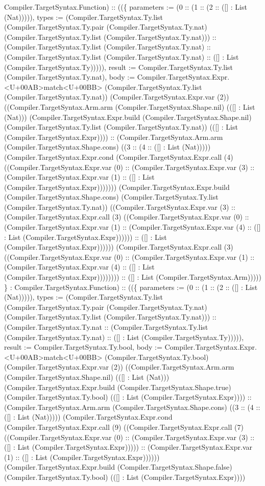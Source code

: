 \documentclass[11pt]{article}
\begin{document}
Compiler.TargetSyntax.Function) :: ((\{ parameters := (0 :: (1 :: (2 :: ([] : List (Nat))))), types := (Compiler.TargetSyntax.Ty.list (Compiler.TargetSyntax.Ty.pair (Compiler.TargetSyntax.Ty.nat) (Compiler.TargetSyntax.Ty.list (Compiler.TargetSyntax.Ty.nat))) :: (Compiler.TargetSyntax.Ty.list (Compiler.TargetSyntax.Ty.nat) :: (Compiler.TargetSyntax.Ty.list (Compiler.TargetSyntax.Ty.nat) :: ([] : List (Compiler.TargetSyntax.Ty))))), result := Compiler.TargetSyntax.Ty.list (Compiler.TargetSyntax.Ty.nat), body := Compiler.TargetSyntax.Expr.<U+00AB>match<U+00BB> (Compiler.TargetSyntax.Ty.list (Compiler.TargetSyntax.Ty.nat)) (Compiler.TargetSyntax.Expr.var (2)) ((Compiler.TargetSyntax.Arm.arm (Compiler.TargetSyntax.Shape.nil) (([] : List (Nat))) (Compiler.TargetSyntax.Expr.build (Compiler.TargetSyntax.Shape.nil) (Compiler.TargetSyntax.Ty.list (Compiler.TargetSyntax.Ty.nat)) (([] : List (Compiler.TargetSyntax.Expr)))) :: (Compiler.TargetSyntax.Arm.arm (Compiler.TargetSyntax.Shape.cons) ((3 :: (4 :: ([] : List (Nat))))) (Compiler.TargetSyntax.Expr.cond (Compiler.TargetSyntax.Expr.call (4) ((Compiler.TargetSyntax.Expr.var (0) :: (Compiler.TargetSyntax.Expr.var (3) :: (Compiler.TargetSyntax.Expr.var (1) :: ([] : List (Compiler.TargetSyntax.Expr))))))) (Compiler.TargetSyntax.Expr.build (Compiler.TargetSyntax.Shape.cons) (Compiler.TargetSyntax.Ty.list (Compiler.TargetSyntax.Ty.nat)) ((Compiler.TargetSyntax.Expr.var (3) :: (Compiler.TargetSyntax.Expr.call (3) ((Compiler.TargetSyntax.Expr.var (0) :: (Compiler.TargetSyntax.Expr.var (1) :: (Compiler.TargetSyntax.Expr.var (4) :: ([] : List (Compiler.TargetSyntax.Expr)))))) :: ([] : List (Compiler.TargetSyntax.Expr)))))) (Compiler.TargetSyntax.Expr.call (3) ((Compiler.TargetSyntax.Expr.var (0) :: (Compiler.TargetSyntax.Expr.var (1) :: (Compiler.TargetSyntax.Expr.var (4) :: ([] : List (Compiler.TargetSyntax.Expr)))))))) :: ([] : List (Compiler.TargetSyntax.Arm))))) \} : Compiler.TargetSyntax.Function) :: ((\{ parameters := (0 :: (1 :: (2 :: ([] : List (Nat))))), types := (Compiler.TargetSyntax.Ty.list (Compiler.TargetSyntax.Ty.pair (Compiler.TargetSyntax.Ty.nat) (Compiler.TargetSyntax.Ty.list (Compiler.TargetSyntax.Ty.nat))) :: (Compiler.TargetSyntax.Ty.nat :: (Compiler.TargetSyntax.Ty.list (Compiler.TargetSyntax.Ty.nat) :: ([] : List (Compiler.TargetSyntax.Ty))))), result := Compiler.TargetSyntax.Ty.bool, body := Compiler.TargetSyntax.Expr.<U+00AB>match<U+00BB> (Compiler.TargetSyntax.Ty.bool) (Compiler.TargetSyntax.Expr.var (2)) ((Compiler.TargetSyntax.Arm.arm (Compiler.TargetSyntax.Shape.nil) (([] : List (Nat))) (Compiler.TargetSyntax.Expr.build (Compiler.TargetSyntax.Shape.true) (Compiler.TargetSyntax.Ty.bool) (([] : List (Compiler.TargetSyntax.Expr)))) :: (Compiler.TargetSyntax.Arm.arm (Compiler.TargetSyntax.Shape.cons) ((3 :: (4 :: ([] : List (Nat))))) (Compiler.TargetSyntax.Expr.cond (Compiler.TargetSyntax.Expr.call (9) ((Compiler.TargetSyntax.Expr.call (7) ((Compiler.TargetSyntax.Expr.var (0) :: (Compiler.TargetSyntax.Expr.var (3) :: ([] : List (Compiler.TargetSyntax.Expr))))) :: (Compiler.TargetSyntax.Expr.var (1) :: ([] : List (Compiler.TargetSyntax.Expr)))))) (Compiler.TargetSyntax.Expr.build (Compiler.TargetSyntax.Shape.false) (Compiler.TargetSyntax.Ty.bool) (([] : List (Compiler.TargetSyntax.Expr)))) 
\end{document}
